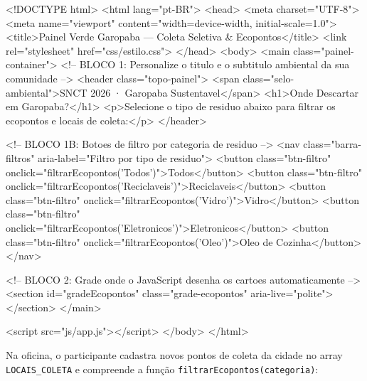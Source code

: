 \begin{boxCodigoHTML}
<!DOCTYPE html>
<html lang="pt-BR">
<head>
  <meta charset="UTF-8">
  <meta name="viewport" content="width=device-width, initial-scale=1.0">
  <title>Painel Verde Garopaba — Coleta Seletiva & Ecopontos</title>
  <link rel="stylesheet" href="css/estilo.css">
</head>
<body>
  <main class="painel-container">
    <!-- BLOCO 1: Personalize o titulo e o subtitulo ambiental da sua comunidade -->
    <header class="topo-painel">
      <span class="selo-ambiental">SNCT 2026 · Garopaba Sustentavel</span>
      <h1>Onde Descartar em Garopaba?</h1>
      <p>Selecione o tipo de residuo abaixo para filtrar os ecopontos e locais de coleta:</p>
    </header>

    <!-- BLOCO 1B: Botoes de filtro por categoria de residuo -->
    <nav class="barra-filtros" aria-label="Filtro por tipo de residuo">
      <button class="btn-filtro" onclick="filtrarEcopontos('Todos')">Todos</button>
      <button class="btn-filtro" onclick="filtrarEcopontos('Reciclaveis')">Reciclaveis</button>
      <button class="btn-filtro" onclick="filtrarEcopontos('Vidro')">Vidro</button>
      <button class="btn-filtro" onclick="filtrarEcopontos('Eletronicos')">Eletronicos</button>
      <button class="btn-filtro" onclick="filtrarEcopontos('Oleo')">Oleo de Cozinha</button>
    </nav>

    <!-- BLOCO 2: Grade onde o JavaScript desenha os cartoes automaticamente -->
    <section id="gradeEcopontos" class="grade-ecopontos" aria-live="polite"></section>
  </main>

  <script src="js/app.js"></script>
</body>
</html>
\end{boxCodigoHTML}


Na oficina, o participante cadastra novos pontos de coleta da cidade no array \texttt{LOCAIS\_COLETA} e compreende a função \texttt{filtrarEcopontos(categoria)}:

